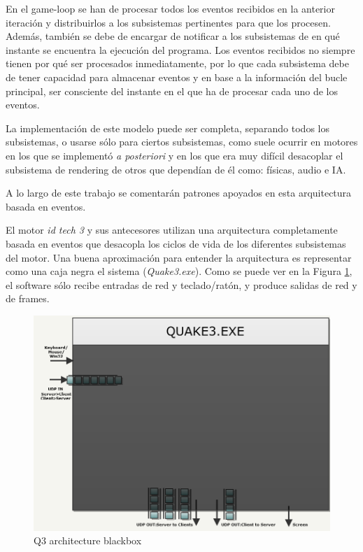 \documentclass[a4paper,12pt]{report}
\begin{document}
\begin{itemize}
		En el game-loop se han de procesar todos los eventos recibidos en la anterior iteración y distribuirlos a los subsistemas pertinentes para que los procesen. Además, también se debe de encargar de notificar a los subsistemas de en qué instante se encuentra la ejecución del programa. Los eventos recibidos no siempre tienen por qué ser procesados inmediatamente, por lo que cada subsistema debe de tener capacidad para almacenar eventos y en base a la información del bucle principal, ser consciente del instante en el que ha de procesar cada uno de los eventos. 
		
		La implementación de este modelo puede ser completa, separando todos los subsistemas, o usarse sólo para ciertos subsistemas, como suele ocurrir en motores en los que se implementó \textit{a posteriori} y en los que era muy difícil desacoplar el subsistema de rendering de otros que dependían de él como: físicas, audio e IA.
	
	    A lo largo de este trabajo se comentarán patrones apoyados en esta arquitectura basada en eventos.
		
	\end{itemize}	

	
	El motor \textit{id tech 3} y sus antecesores utilizan una arquitectura completamente basada en eventos que desacopla los ciclos de vida de los diferentes subsistemas del motor. Una buena aproximación para entender la arquitectura es representar como una caja negra el sistema (\textit{Quake3.exe}). Como se puede ver en la Figura \ref{figarchitectureblackbox}, el software sólo recibe entradas de red y teclado/ratón, y produce salidas de red y de frames.
	
	
	\begin{center}
		\begin{figure}[h]
			\includegraphics[width=1\textwidth]{images/q3_architecture_blackbox}
			\caption{Q3 architecture blackbox}
			\label{figarchitectureblackbox}
		\end{figure}
	\end{center}
\end{document}
